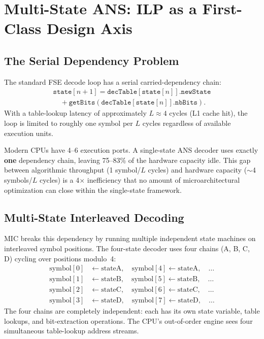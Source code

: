 \documentclass[10pt,twocolumn]{article}
\begin{document}
\section{Multi-State ANS: ILP as a First-Class Design Axis}
\label{sec:multistate}

\subsection{The Serial Dependency Problem}

The standard FSE decode loop has a serial carried-dependency chain:
\begin{align}
  \mathtt{state}[n{+}1] = \mathtt{decTable}[\mathtt{state}[n]].\mathtt{newState} \nonumber\\
  \quad{} + \mathtt{getBits}(\mathtt{decTable}[\mathtt{state}[n]].\mathtt{nbBits}).
\end{align}
With a table-lookup latency of approximately $L \approx 4$ cycles (L1 cache hit), the loop is limited to roughly one symbol per $L$ cycles regardless of available execution units.

Modern CPUs have 4--6 execution ports. A single-state ANS decoder uses exactly \textbf{one} dependency chain, leaving 75--83\% of the hardware capacity idle. This gap between algorithmic throughput (1 symbol/$L$ cycles) and hardware capacity ($\sim$4 symbols/$L$ cycles) is a 4$\times$ inefficiency that no amount of microarchitectural optimization can close within the single-state framework.

\subsection{Multi-State Interleaved Decoding}

MIC breaks this dependency by running multiple independent state machines on interleaved symbol positions. The four-state decoder uses four chains (A, B, C, D) cycling over positions modulo~4:
\begin{align*}
  \text{symbol}[0] &\leftarrow \text{stateA}, \quad \text{symbol}[4] \leftarrow \text{stateA}, \quad \ldots \\
  \text{symbol}[1] &\leftarrow \text{stateB}, \quad \text{symbol}[5] \leftarrow \text{stateB}, \quad \ldots \\
  \text{symbol}[2] &\leftarrow \text{stateC}, \quad \text{symbol}[6] \leftarrow \text{stateC}, \quad \ldots \\
  \text{symbol}[3] &\leftarrow \text{stateD}, \quad \text{symbol}[7] \leftarrow \text{stateD}, \quad \ldots
\end{align*}
The four chains are completely independent: each has its own state variable, table lookups, and bit-extraction operations. The CPU's out-of-order engine sees four simultaneous table-lookup address streams.
\end{document}
